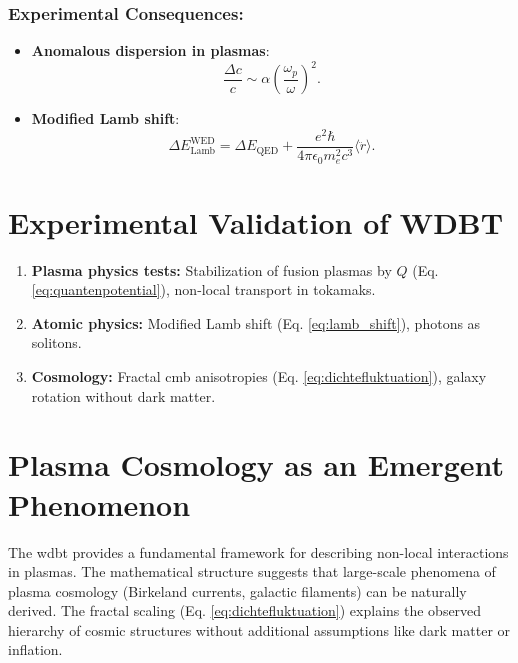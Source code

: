 \subsubsection{Experimental Consequences:}

\begin{itemize}
    \item \textbf{Anomalous dispersion in plasmas}:
    \begin{equation}
    \frac{\Delta c}{c} \sim \alpha \left(\frac{\omega_p}{\omega}\right)^2.
    \end{equation}
    \item \textbf{Modified Lamb shift}:
    \begin{equation}
        \label{eq:lamb_shift}
        \Delta E_{\text{Lamb}}^{\text{WED}} = \Delta E_{\text{QED}} + \frac{e^2 \hbar}{4\pi \epsilon_0 m_e^2 c^3} \langle \ddot{r} \rangle.
    \end{equation}
\end{itemize}

\section{Experimental Validation of WDBT}
\label{sec:experimentelle_konsequenzen}

\begin{enumerate}
    \item \textbf{Plasma physics tests:} Stabilization of fusion plasmas by $Q$ (Eq. \ref{eq:quantenpotential}), non-local transport in tokamaks.
    \item \textbf{Atomic physics:} Modified Lamb shift (Eq. \ref{eq:lamb_shift}), photons as solitons.
    \item \textbf{Cosmology:} Fractal \gls{cmb} anisotropies (Eq. \ref{eq:dichtefluktuation}), galaxy rotation without dark matter.
\end{enumerate}

\section{Plasma Cosmology as an Emergent Phenomenon}
The \gls{wdbt} provides a fundamental framework for describing non-local interactions in plasmas. The mathematical structure suggests that large-scale phenomena of plasma cosmology (Birkeland currents, galactic filaments) can be naturally derived. The fractal scaling (Eq. \ref{eq:dichtefluktuation}) explains the observed hierarchy of cosmic structures without additional assumptions like dark matter or inflation.